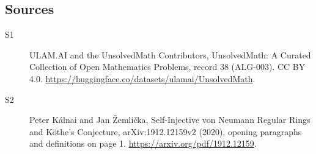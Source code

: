 \documentclass[11pt]{article}
\begin{document}
\subsection{Sources}
\begin{description}
\item[\hypertarget{source:38:1}{S1}] ULAM.AI and the UnsolvedMath Contributors, UnsolvedMath: A Curated Collection of Open Mathematics Problems, record 38 (ALG-003). CC BY 4.0. \url{https://huggingface.co/datasets/ulamai/UnsolvedMath}.
\item[\hypertarget{source:38:2}{S2}] Peter Kálnai and Jan Žemlička, Self-Injective von Neumann Regular Rings and Köthe’s Conjecture, arXiv:1912.12159v2 (2020), opening paragraphs and definitions on page 1. \url{https://arxiv.org/pdf/1912.12159}.
\end{description}
\label{end:38}
\end{document}
